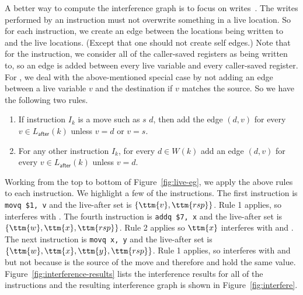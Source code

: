 \documentclass[11pt]{book}
\begin{document}
{A better way to compute the interference graph is to focus on
writes~\citep{Appel:2003fk}. The writes performed by an instruction
must not overwrite something in a live location. So for each
instruction, we create an edge between the locations being written to
and the live locations. (Except that one should not create self
edges.)  Note that for the  instruction, we consider all of
the caller-saved registers as being written to, so an edge is added
between every live variable and every caller-saved register. For
, we deal with the above-mentioned special case by not
adding an edge between a live variable $v$ and the destination if $v$
matches the source. So we have the following two rules.

\begin{enumerate}
\item If instruction $I_k$ is a move such as  $s$\key{,}
  $d$, then add the edge $(d,v)$ for every $v \in
  L_{\mathsf{after}}(k)$ unless $v = d$ or $v = s$.

\item For any other instruction $I_k$, for every $d \in W(k)$
  add an edge $(d,v)$ for every $v \in L_{\mathsf{after}}(k)$ unless $v = d$.
  

\end{enumerate}

Working from the top to bottom of Figure~\ref{fig:live-eg}, we apply
the above rules to each instruction. We highlight a few of the
instructions.  The first instruction is \lstinline{movq $1, v} and the
live-after set is $\{\ttm{v},\ttm{rsp}\}$. Rule 1 applies, so 
interferes with .
%
The fourth instruction is \lstinline{addq $7, x} and the live-after
set is $\{\ttm{w},\ttm{x},\ttm{rsp}\}$. Rule 2 applies so $\ttm{x}$
interferes with  and .
%
The next instruction is \lstinline{movq x, y} and the live-after set
is $\{\ttm{w},\ttm{x},\ttm{y},\ttm{rsp}\}$. Rule 1 applies, so 
interferes with  and  but not  because 
is the source of the move and therefore  and  hold the
same value. Figure~\ref{fig:interference-results} lists the
interference results for all of the instructions and the resulting
interference graph is shown in Figure~\ref{fig:interfere}.


}
\end{document}
